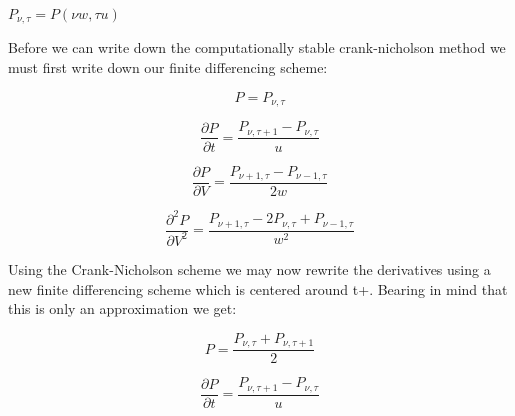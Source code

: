 \documentclass[10pt]{article}
\begin{document}

$P_{\nu,\tau} = P(\nu w,\tau u)$

Before we can write down the computationally stable crank-nicholson
method we must first write down our finite differencing scheme:

\begin{equation}
    P = P_{\nu,\tau}
\end{equation}

\begin{equation}
    \frac{\partial P}{\partial t} = \frac{P_{\nu,\tau +1 } -
    P_{\nu,\tau}}{u}
\end{equation}

\begin{equation}
    \frac{\partial P}{\partial V} = 
    \frac{P_{\nu +1,\tau } -
    P_{\nu - 1,\tau } }
    {2w}
\end{equation}

\begin{equation}
    \frac{\partial^2 P}{\partial V^2} = 
    \frac{P_{\nu+1,\tau} - 2 P_{\nu,\tau} + P_{\nu-1,\tau}}
    {w^2}
\end{equation}


Using the Crank-Nicholson scheme we  may now rewrite the derivatives
using a new finite differencing scheme which is centered around t+. Bearing in mind that this is only
an approximation we get:


\begin{equation}
    P = \frac{P_{\nu,\tau} + P_{\nu,\tau + 1}}{2}
\end{equation}

\begin{equation}
    \frac{\partial P}{\partial t} = \frac{P_{\nu,\tau +1 } -
    P_{\nu,\tau}}{u}
\end{equation}
\end{document}
